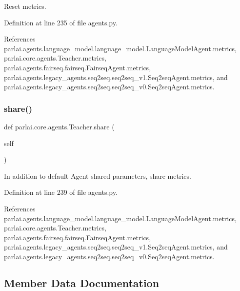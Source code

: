 \begin{DoxyVerb}Reset metrics.\end{DoxyVerb}
 

Definition at line 235 of file agents.\+py.



References parlai.\+agents.\+language\+\_\+model.\+language\+\_\+model.\+Language\+Model\+Agent.\+metrics, parlai.\+core.\+agents.\+Teacher.\+metrics, parlai.\+agents.\+fairseq.\+fairseq.\+Fairseq\+Agent.\+metrics, parlai.\+agents.\+legacy\+\_\+agents.\+seq2seq.\+seq2seq\+\_\+v1.\+Seq2seq\+Agent.\+metrics, and parlai.\+agents.\+legacy\+\_\+agents.\+seq2seq.\+seq2seq\+\_\+v0.\+Seq2seq\+Agent.\+metrics.

\mbox{\label{classparlai_1_1core_1_1agents_1_1Teacher_a43cf8d0b49ef4ff150ceef0149c063c3}} 
\subsubsection{\texorpdfstring{share()}{share()}}
{\footnotesize\ttfamily def parlai.\+core.\+agents.\+Teacher.\+share (\begin{DoxyParamCaption}\item[{}]{self }\end{DoxyParamCaption})}

\begin{DoxyVerb}In addition to default Agent shared parameters, share metrics.\end{DoxyVerb}
 

Definition at line 239 of file agents.\+py.



References parlai.\+agents.\+language\+\_\+model.\+language\+\_\+model.\+Language\+Model\+Agent.\+metrics, parlai.\+core.\+agents.\+Teacher.\+metrics, parlai.\+agents.\+fairseq.\+fairseq.\+Fairseq\+Agent.\+metrics, parlai.\+agents.\+legacy\+\_\+agents.\+seq2seq.\+seq2seq\+\_\+v1.\+Seq2seq\+Agent.\+metrics, and parlai.\+agents.\+legacy\+\_\+agents.\+seq2seq.\+seq2seq\+\_\+v0.\+Seq2seq\+Agent.\+metrics.



\subsection{Member Data Documentation}
\mbox{\label{classparlai_1_1core_1_1agents_1_1Teacher_a2a21915f2270b76ba0e99137d506af89}} 
